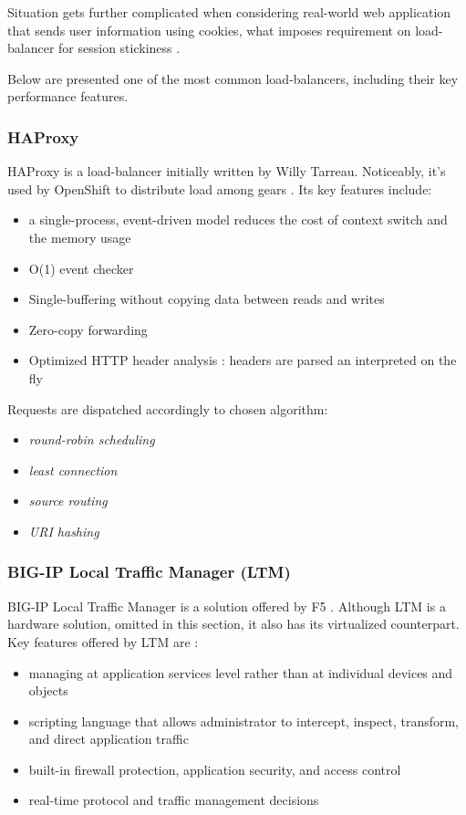 Situation gets further complicated when considering real-world web application that sends user information using cookies, what imposes requirement on load-balancer for session stickiness \cite{StBaMa11}. 

Below are presented one of the most common load-balancers, including their key performance features.

\subsubsection*{HAProxy}

HAProxy \cite{HAProxy} is a load-balancer initially written by Willy Tarreau. Noticeably, it's used by OpenShift \cite{OpenShift} to distribute load among gears \cite{OpenShiftScaling}. Its key features include:
\begin{itemize}
	\item a single-process, event-driven model reduces the cost of context switch and the memory usage
	\item O(1) event checker
	\item Single-buffering without copying data between reads and writes
	\item Zero-copy forwarding
	\item Optimized HTTP header analysis : headers are parsed an interpreted on the fly
\end{itemize}

Requests are dispatched accordingly to chosen algorithm:
\begin{itemize}
  \item \textit{round-robin scheduling}
  \item \textit{least connection}
  \item \textit{source routing}
  \item \textit{URI hashing}
\end{itemize}

\subsubsection*{BIG-IP Local Traffic Manager (LTM)}
BIG-IP Local Traffic Manager is a solution offered by F5 \cite{F5}. Although LTM is a hardware solution, omitted in this section, it also has its virtualized counterpart. Key features offered by LTM are \cite{LTM}:
\begin{itemize}
  \item managing at application services level rather than at individual devices and objects
  \item scripting language that allows administrator to intercept, inspect, transform, and direct application traffic
  \item built-in firewall protection, application security, and access control
  \item real-time protocol and traffic management decisions
\end{itemize}

